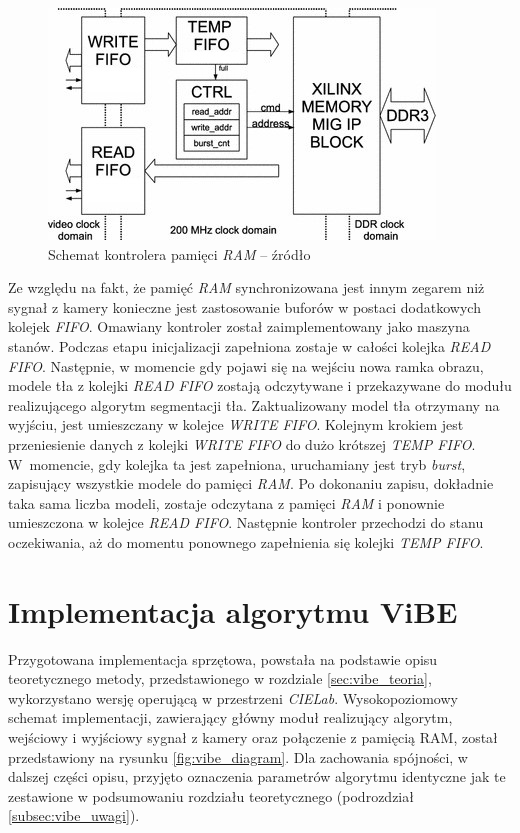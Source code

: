	\begin{figure}[h!]
		\centering
		\includegraphics[scale=0.9]{img/4/ram_ctrl_scheme.jpg}
		\caption{Schemat kontrolera pamięci \textit{RAM} -- źródło \cite{kryjak_14_hd_fpga}}
		\label{fig:ram_ctrl}
	\end{figure}

Ze względu na fakt, że pamięć \textit{RAM} synchronizowana jest innym zegarem niż sygnał z kamery konieczne jest zastosowanie buforów w postaci dodatkowych kolejek \textit{FIFO}. Omawiany kontroler został zaimplementowany jako maszyna stanów. Podczas etapu inicjalizacji zapełniona zostaje w całości kolejka \textit{READ FIFO}. Następnie, w momencie gdy pojawi się na wejściu nowa ramka obrazu, modele tła z kolejki \textit{READ FIFO} zostają odczytywane i przekazywane do modułu realizującego algorytm segmentacji tła. Zaktualizowany model tła otrzymany na wyjściu, jest umieszczany w kolejce \textit{WRITE FIFO}. Kolejnym krokiem jest przeniesienie danych z kolejki \textit{WRITE FIFO} do dużo krótszej \textit{TEMP FIFO}. W~momencie, gdy kolejka ta jest zapełniona, uruchamiany jest tryb \textit{burst}, zapisujący wszystkie modele do pamięci \textit{RAM}. Po dokonaniu zapisu, dokładnie taka sama liczba modeli, zostaje odczytana z pamięci \textit{RAM} i ponownie umieszczona w kolejce \textit{READ FIFO}. Następnie kontroler przechodzi do stanu oczekiwania, aż do momentu ponownego zapełnienia się kolejki \textit{TEMP FIFO}.

\section{Implementacja algorytmu ViBE}
\label{sec:fpga_vibe}

Przygotowana implementacja sprzętowa, powstała na podstawie opisu teoretycznego metody, przedstawionego w rozdziale \ref{sec:vibe_teoria}, wykorzystano wersję operującą w przestrzeni \textit{CIELab}.  Wysokopoziomowy schemat implementacji, zawierający główny moduł realizujący algorytm, wejściowy i wyjściowy sygnał z kamery oraz połączenie z pamięcią RAM, został przedstawiony na rysunku \ref{fig:vibe_diagram}. Dla zachowania spójności, w dalszej części opisu, przyjęto oznaczenia parametrów algorytmu identyczne jak te zestawione w podsumowaniu rozdziału teoretycznego (podrozdział \ref{subsec:vibe_uwagi}).

